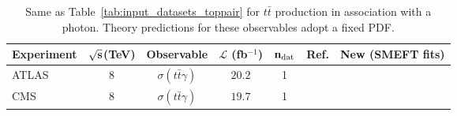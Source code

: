 \begin{table}[t]
{\fontsize{8pt}{8pt}\selectfont
  \centering
   \renewcommand{\arraystretch}{2}
   \setlength{\tabcolsep}{5pt}
   \begin{tabular}{lccccc|c}
     \toprule \textbf{Experiment}     & $\bf{\sqrt{s}}$\textbf{(TeV)}
     &   \textbf{Observable} & $\mathcal{L}$ (fb${}^{-1}$) & $\mathbf{n_{\rm dat}}$ & \textbf{Ref.}   
    &  \textbf{New (SMEFT fits)} \\
    \toprule
    ATLAS
    & 8
    & $\sigma(t\bar{t}\gamma)$
    & $20.2$
    & 1
    &\cite{Aaboud:2017era}
    & \\
  \midrule
      CMS
    & 8
    & $\sigma(t\bar{t}\gamma)$
    & $19.7$
    & 1
    & \cite{Sirunyan:2017iyh}
    & \\
\bottomrule
   \end{tabular}
   \vspace{0.3cm}
  \caption{\small Same as Table~\ref{tab:input_datasets_toppair} for
     $t\bar{t}$ production in association with a photon.
    \label{tab:input_datasets2b}
    Theory predictions for these observables adopt a fixed PDF.
   }
   }
\end{table}

